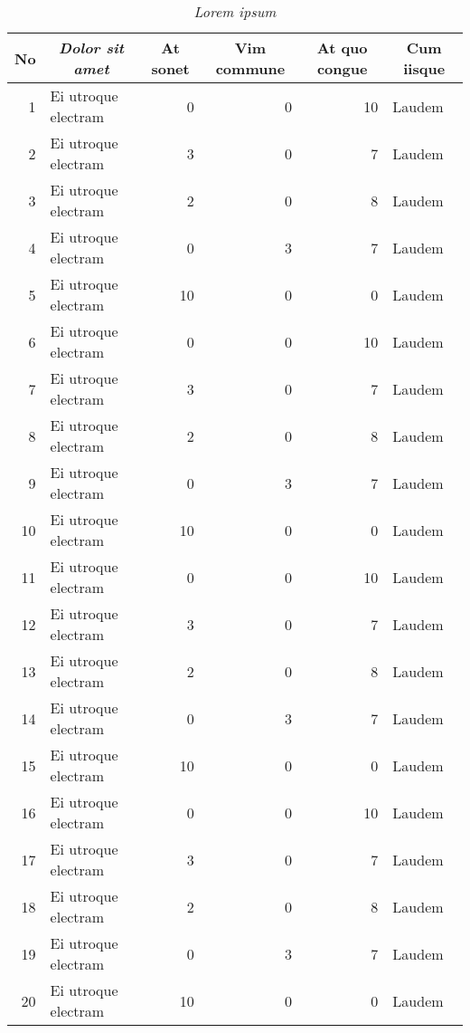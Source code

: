 \begin{small}
\begin{longtable}[c]{|r|l|r|r|r|l|}
\caption{\textit{Lorem ipsum}} 
\label{lampiran-dataset}\\
\hline
\multicolumn{1}{|c|}{\textbf{No}} &
  \multicolumn{1}{c|}{\textit{\textbf{Dolor sit amet}}} &
  \multicolumn{1}{c|}{\textbf{At sonet}} &
  \multicolumn{1}{c|}{\textbf{Vim commune}} &
  \multicolumn{1}{c|}{\textbf{At quo congue}} &
  \multicolumn{1}{c|}{\textbf{Cum iisque}} \\ \hline
\endhead

1   & Ei utroque electram & 0  & 0  & 10 & Laudem  \\ \hline
2   & Ei utroque electram & 3  & 0  & 7  & Laudem  \\ \hline
3   & Ei utroque electram & 2  & 0  & 8  & Laudem  \\ \hline
4   & Ei utroque electram & 0  & 3  & 7  & Laudem  \\ \hline
5   & Ei utroque electram & 10 & 0  & 0  & Laudem  \\ \hline
6   & Ei utroque electram & 0  & 0  & 10 & Laudem  \\ \hline
7   & Ei utroque electram & 3  & 0  & 7  & Laudem  \\ \hline
8   & Ei utroque electram & 2  & 0  & 8  & Laudem  \\ \hline
9   & Ei utroque electram & 0  & 3  & 7  & Laudem  \\ \hline
10   & Ei utroque electram & 10 & 0  & 0  & Laudem  \\ \hline
11   & Ei utroque electram & 0  & 0  & 10 & Laudem  \\ \hline
12   & Ei utroque electram & 3  & 0  & 7  & Laudem  \\ \hline
13   & Ei utroque electram & 2  & 0  & 8  & Laudem  \\ \hline
14   & Ei utroque electram & 0  & 3  & 7  & Laudem  \\ \hline
15   & Ei utroque electram & 10 & 0  & 0  & Laudem  \\ \hline
16   & Ei utroque electram & 0  & 0  & 10 & Laudem  \\ \hline
17   & Ei utroque electram & 3  & 0  & 7  & Laudem  \\ \hline
18   & Ei utroque electram & 2  & 0  & 8  & Laudem  \\ \hline
19   & Ei utroque electram & 0  & 3  & 7  & Laudem  \\ \hline
20   & Ei utroque electram & 10 & 0  & 0  & Laudem  \\ \hline

\end{longtable}
\end{small}
